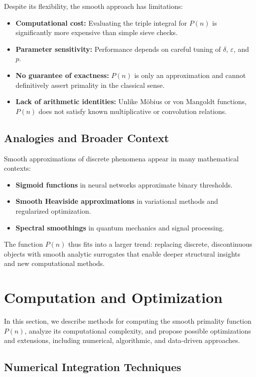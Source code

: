 \documentclass[12pt]{article}
\theoremstyle{definition}
\theoremstyle{plain}
\theoremstyle{remark}
\begin{document}
Despite its flexibility, the smooth approach has limitations:
\begin{itemize}
    \item \textbf{Computational cost:} Evaluating the triple integral for \( P(n) \) is significantly more expensive than simple sieve checks.
    \item \textbf{Parameter sensitivity:} Performance depends on careful tuning of \( \delta \), \( \varepsilon \), and \( p \).
    \item \textbf{No guarantee of exactness:} \( P(n) \) is only an approximation and cannot definitively assert primality in the classical sense.
    \item \textbf{Lack of arithmetic identities:} Unlike Möbius or von Mangoldt functions, \( P(n) \) does not satisfy known multiplicative or convolution relations.
\end{itemize}

\subsection{Analogies and Broader Context}

Smooth approximations of discrete phenomena appear in many mathematical contexts:
\begin{itemize}
    \item \textbf{Sigmoid functions} in neural networks approximate binary thresholds.
    \item \textbf{Smooth Heaviside approximations} in variational methods and regularized optimization.
    \item \textbf{Spectral smoothings} in quantum mechanics and signal processing.
\end{itemize}

The function \( P(n) \) thus fits into a larger trend: replacing discrete, discontinuous objects with smooth analytic surrogates that enable deeper structural insights and new computational methods.

\section{Computation and Optimization}

In this section, we describe methods for computing the smooth primality function \( P(n) \), analyze its computational complexity, and propose possible optimizations and extensions, including numerical, algorithmic, and data-driven approaches.

\subsection{Numerical Integration Techniques}
\end{document}
